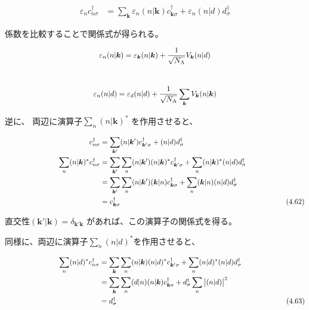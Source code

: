 \documentclass[a4j]{jarticle}
\begin{document}
\begin{align}
	\varepsilon_{n}
	c_{n \sigma}^{\dagger}
	 & =
	\sum_{\bm{k}}
	\varepsilon_{n}
	( n | \bm{k} )
	c^{\dagger}_{\bm{k} \sigma}
	+
	\varepsilon_{n}
	( n | d )
	d^{\dagger}_{\sigma}
\end{align}

係数を比較することで関係式が得られる。

\begin{align}
	\hspace{44.3mm}
	\varepsilon_{n}
	( n | \bm{k} )
	=
	\varepsilon_{\bm{k}}
	( n | \bm{k} )
	+
	\frac{1}{\sqrt{N_{\rm A}}}
	V_{\bm{k}} (n | d)
	\hspace{44.3mm}
\end{align}
\\[-10mm]
\begin{align}
	\hspace{41.5mm}
	\varepsilon_{n}
	( n | d )
	=
	\varepsilon_{d}
	( n | d )
	+
	\frac{1}{\sqrt{N_{\rm A}}}
	\sum_{\bm{k}}
	V_{\bm{k}} (n | \bm{k})
	\hspace{41.5mm}
\end{align}

逆に、
両辺に演算子$\displaystyle \sum_{n} ( n | \bm{k} )^{*}$
を作用させると、

\begin{align}
	c^{\dagger}_{n \sigma}
	 & =
	\sum_{\bm{k}'}
	( n | \bm{k}' )
	c^{\dagger}_{\bm{k}' \sigma}
	+
	( n | d )
	d^{\dagger}_{\sigma}
	\nonumber \\
	\hspace{26mm}
	\sum_{n} ( n | \bm{k} )^{*}
	c^{\dagger}_{n \sigma}
	 & =
	\sum_{\bm{k}'}
	\sum_{n}
	( n | \bm{k}' )
	( n | \bm{k} )^{*}
	c^{\dagger}_{\bm{k}' \sigma}
	+
	\sum_{n} ( n | \bm{k} )^{*}
	( n | d )
	d^{\dagger}_{\sigma}
	\nonumber \\ &=
	\sum_{\bm{k}'}
	\sum_{n}
	( n | \bm{k}' )
	( \bm{k} | n )
	c^{\dagger}_{\bm{k} \sigma}
	+
	\sum_{n}
	( \bm{k} | n )
	( n | d )
	d^{\dagger}_{\sigma}
	\nonumber \\ &=
	c^{\dagger}_{\bm{k} \sigma}
	\nonumber
	\hspace{80mm}
	(4.62)
\end{align}

直交性$\displaystyle
	(\bm{k}'|\bm{k})=\delta_{\bm{k}' \bm{k}}
$
があれば、この演算子の関係式を得る。

同様に、両辺に演算子$\displaystyle \sum_{n} ( n | d )^{*}$を作用させると、

\begin{align}
	\hspace{26mm}
	\sum_{n} ( n | d )^{*}
	c^{\dagger}_{n \sigma}
	 & =
	\sum_{\bm{k}}
	\sum_{n}
	( n | \bm{k} )
	( n | d )^{*}
	c^{\dagger}_{\bm{k}' \sigma}
	+
	\sum_{n} ( n | d )^{*}
	( n | d )
	d^{\dagger}_{\sigma}
	\nonumber \\ &=
	\sum_{\bm{k}}
	\sum_{n}
	( d | n )
	( n | \bm{k} )
	c^{\dagger}_{\bm{k} \sigma}
	+
	d^{\dagger}_{\sigma}
	\sum_{n}
	\big|
	( n | d )
	\big|^{2}
	\nonumber \\ &=
	d^{\dagger}_{\sigma}
	\nonumber
	\hspace{82mm}
	(4.63)
\end{align}
\end{document}
